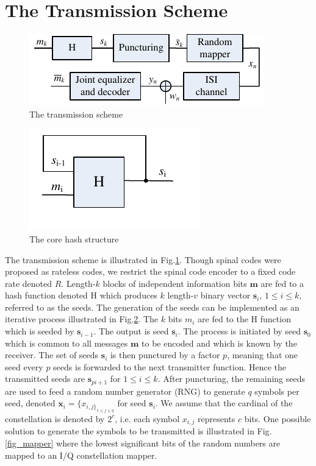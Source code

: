 \documentclass[conference]{IEEEtran}
\begin{document}
\section{The Transmission Scheme} \label{sec:TXscheme}
\begin{figure}[ht]
\centering
\includegraphics[width=0.9\columnwidth]{tranScheme.pdf}
\caption{The transmission scheme}
\label{fig_tranScheme}
\end{figure}
\begin{figure}[ht]
\centering
\includegraphics[width=1.75 in]{encoderCore.pdf}
\caption{The core hash structure}
\label{fig_hash}
\end{figure}
The transmission scheme is illustrated in Fig.\ref{fig_tranScheme}. Though spinal codes were  proposed as rateless codes, we restrict the spinal code encoder to a fixed code rate denoted $R$. Length-$k$ blocks of independent information bits ${\bm m}$ are fed to a hash function denoted H which produces $k$ length-$v$ binary vector $\bm s_i,\,1\leq i \leq k$, referred to as the seeds. The generation of the seeds can be implemented as an iterative process illustrated in Fig.\ref{fig_hash}. The $k$ bits $m_i$ are fed to the H function which is seeded by $\bm s_{i-1}$. The output is seed $\bm s_i$. The process is initiated by seed $\bm s_0$ which is common to all messages $\bm m$ to be encoded and which is known by the receiver. The set of seeds $\bm s_i$ is then punctured by a factor $p$, meaning that one seed every $p$ seeds is forwarded to the next transmitter function. Hence the transmitted seeds are $\bm s_{pi+1}$ for $1\leq i \leq k$. After puncturing, the remaining seeds are used to feed a random number generator (RNG) to generate $q$ symbols per seed, denoted ${\bm x_i} = \{x_{i,j\}_{1\leq j \leq q}}$ for seed $\bm s_i$. We assume that the cardinal of the constellation is denoted by $2^c$, i.e. each symbol $x_{i,j}$ represents $c$ bits. One possible solution to generate the symbols to be transmitted is illustrated in Fig.\ref{fig_mapper} where the lowest significant bits of the random numbers are mapped to an I/Q constellation mapper.
\end{document}
